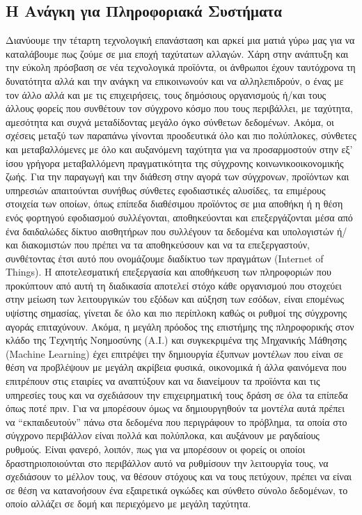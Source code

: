 \documentclass{article}
\begin{document}
\subsection{Η Ανάγκη για Πληροφοριακά Συστήματα}
Διανύουμε την τέταρτη τεχνολογική επανάσταση και αρκεί μια ματιά γύρω μας για να καταλάβουμε πως ζούμε σε μια εποχή ταχύτατων αλλαγών. Χάρη στην ανάπτυξη και την εύκολη πρόσβαση σε νέα τεχνολογικά προϊόντα, οι άνθρωποι έχουν ταυτόχρονα τη δυνατότητα αλλά και την ανάγκη να επικοινωνούν και να αλληλεπιδρούν, ο ένας με τον άλλο αλλά και με τις επιχειρήσεις, τους δημόσιους οργανισμούς ή/και τους άλλους φορείς που συνθέτουν τον σύγχρονο κόσμο που τους περιβάλλει, με ταχύτητα, αμεσότητα και συχνά μεταδίδοντας μεγάλο όγκο σύνθετων δεδομένων. Ακόμα, οι σχέσεις μεταξύ των παραπάνω γίνονται προοδευτικά όλο και πιο πολύπλοκες, σύνθετες και μεταβαλλόμενες με όλο και αυξανόμενη ταχύτητα για να προσαρμοστούν στην εξ’ ίσου γρήγορα μεταβαλλόμενη πραγματικότητα της σύγχρονης κοινωνικοοικονομικής ζωής. Για την παραγωγή και την διάθεση στην αγορά των σύγχρονων, προϊόντων και υπηρεσιών απαιτούνται συνήθως σύνθετες εφοδιαστικές αλυσίδες, τα επιμέρους στοιχεία των οποίων, όπως επίπεδα διαθέσιμου προϊόντος σε μια αποθήκη ή η θέση ενός φορτηγού εφοδιασμού συλλέγονται, αποθηκεύονται και επεξεργάζονται μέσα από ένα δαιδαλώδες δίκτυο αισθητήρων που συλλέγουν τα δεδομένα  και υπολογιστών ή/και διακομιστών που πρέπει να τα αποθηκεύσουν και να τα επεξεργαστούν, συνθέτοντας έτσι αυτό που ονομάζουμε διαδίκτυο των πραγμάτων (Internet of Things). Η αποτελεσματική επεξεργασία και αποθήκευση των πληροφοριών που προκύπτουν από αυτή τη διαδικασία αποτελεί στόχο κάθε οργανισμού που στοχεύει στην μείωση των λειτουργικών του εξόδων και αύξηση των εσόδων, είναι επομένως υψίστης σημασίας, γίνεται δε όλο και πιο περίπλοκη καθώς οι ρυθμοί της σύγχρονης αγοράς επιταχύνουν. Ακόμα, η μεγάλη πρόοδος της επιστήμης της πληροφορικής στον κλάδο της Τεχνητής Νοημοσύνης (A.I.) και συγκεκριμένα της Μηχανικής Μάθησης (Machine Learning) έχει επιτρέψει την δημιουργία έξυπνων μοντέλων που είναι σε θέση να προβλέψουν με μεγάλη ακρίβεια φυσικά, οικονομικά ή άλλα φαινόμενα που επιτρέπουν στις εταιρίες να αναπτύξουν και να διανείμουν τα προϊόντα και τις υπηρεσίες τους και να σχεδιάσουν την επιχειρηματική τους δράση σε όλα τα επίπεδα όπως ποτέ πριν. Για να μπορέσουν όμως να δημιουργηθούν τα μοντέλα αυτά πρέπει να “εκπαιδευτούν” πάνω στα δεδομένα που περιγράφουν το πρόβλημα, τα οποία στο σύγχρονο περιβάλλον είναι πολλά και πολύπλοκα, και αυξάνουν με ραγδαίους ρυθμούς. Είναι φανερό, λοιπόν, πως για να μπορέσουν οι φορείς οι οποίοι δραστηριοποιούνται στο περιβάλλον αυτό να ρυθμίσουν την λειτουργία τους, να σχεδιάσουν το μέλλον τους, να θέσουν στόχους και να τους πετύχουν, πρέπει να  είναι σε θέση να κατανοήσουν ένα εξαιρετικά ογκώδες και σύνθετο σύνολο δεδομένων, το οποίο αλλάζει σε δομή και περιεχόμενο με μεγάλη ταχύτητα.
\end{document}
